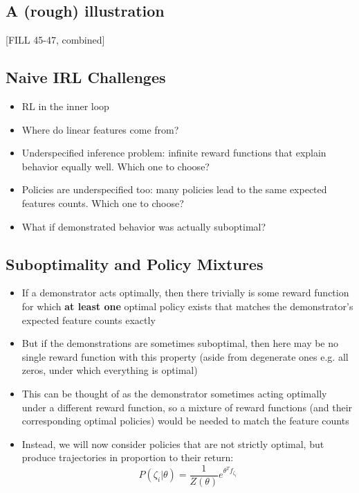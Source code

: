 \documentclass[10pt]{article}
\begin{document}
\subsection*{A (rough) illustration}
[FILL 45-47, combined]

\subsection*{Naive IRL Challenges}
\begin{itemize}
	\item RL in the inner loop
	\item Where do linear features come from?
	\item Underspecified inference problem: infinite reward functions that explain behavior equally well.  Which one to choose?
	\item Policies are underspecified too: many policies lead to the same expected features counts.  Which one to choose?
	\item What if demonstrated behavior was actually suboptimal?
\end{itemize}

\subsection*{Suboptimality and Policy Mixtures}
\begin{itemize}
	\item If a demonstrator acts optimally, then there trivially is some reward function for which \textbf{at least one} optimal policy exists that matches the demonstrator's expected feature counts exactly
	\item But if the demonstrations are sometimes suboptimal, then here may be no single reward function with this property (aside from degenerate ones e.g. all zeros, under which everything is optimal)
	\item This can be thought of as the demonstrator sometimes acting optimally under a different reward function, so a mixture of reward functions (and their corresponding optimal policies) would be needed to match the feature counts
	\item Instead, we will now consider policies that are not strictly optimal, but produce trajectories in proportion to their return:
	\[P(\zeta_i | \theta) = \frac{1}{Z(\theta)} e^{\theta^T f_{\zeta_i}}\]
\end{itemize}
\end{document}
